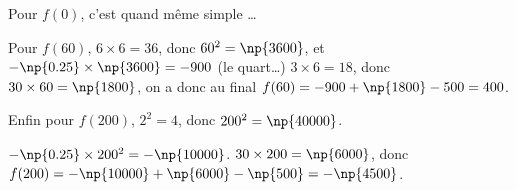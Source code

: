 \begin{enumerate}
Pour $f(0)$, c'est quand même simple \dots

Pour $f(60)$, \mbox{$6\times6=36$}, donc \mbox{$60^2=\np{3600}$}, et \mbox{$-\np{0.25}\times\np{3600}=-900$} (le quart\dots)  \mbox{$3\times6=18$}, donc \mbox{$30\times60=\np{1800}$}, on a donc \og{}au final\fg{} \mbox{$f(60)=-900+\np{1800}-500=400$}.

Enfin pour \mbox{$f(200)$}, \mbox{$2^2=4$}, donc \mbox{$200^2=\np{40000}$}.

\mbox{$-\np{0.25}\times200^2=-\np{10000}$}. \mbox{$30\times200=\np{6000}$}, donc \mbox{$f(200)=-\np{10000}+\np{6000}-\np{500}=-\np{4500}$}.

\end{enumerate}


